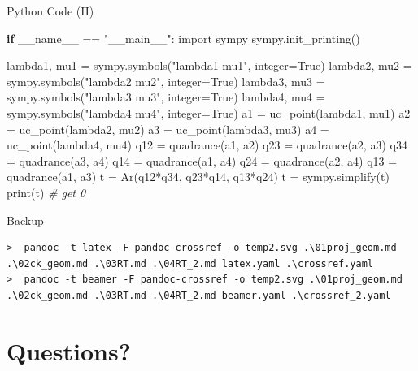 \documentclass[10pt,ignorenonframetext,serif,onlymath]{beamer}
\newenvironment{Shaded}{}{}
\newcommand{\BuiltInTok}[1]{#1}
\newcommand{\CommentTok}[1]{\textcolor[rgb]{0.38,0.63,0.69}{\textit{#1}}}
\newcommand{\ControlFlowTok}[1]{\textcolor[rgb]{0.00,0.44,0.13}{\textbf{#1}}}
\newcommand{\ImportTok}[1]{#1}
\newcommand{\NormalTok}[1]{#1}
\newcommand{\OperatorTok}[1]{\textcolor[rgb]{0.40,0.40,0.40}{#1}}
\newcommand{\StringTok}[1]{\textcolor[rgb]{0.25,0.44,0.63}{#1}}
\newcommand{\VariableTok}[1]{\textcolor[rgb]{0.10,0.09,0.49}{#1}}
\begin{document}
\begin{frame}[fragile]{Python Code (II)}
\protect\hypertarget{sec:python-code-ii}{}

\scriptsize

\begin{Shaded}
\begin{Highlighting}[]
\ControlFlowTok{if} \VariableTok{__name__} \OperatorTok{==} \StringTok{"__main__"}\NormalTok{:}
    \ImportTok{import}\NormalTok{ sympy}
\NormalTok{    sympy.init_printing()}

\NormalTok{    lambda1, mu1 }\OperatorTok{=}\NormalTok{ sympy.symbols(}\StringTok{"lambda1 mu1"}\NormalTok{, integer}\OperatorTok{=}\VariableTok{True}\NormalTok{)}
\NormalTok{    lambda2, mu2 }\OperatorTok{=}\NormalTok{ sympy.symbols(}\StringTok{"lambda2 mu2"}\NormalTok{, integer}\OperatorTok{=}\VariableTok{True}\NormalTok{)}
\NormalTok{    lambda3, mu3 }\OperatorTok{=}\NormalTok{ sympy.symbols(}\StringTok{"lambda3 mu3"}\NormalTok{, integer}\OperatorTok{=}\VariableTok{True}\NormalTok{)}
\NormalTok{    lambda4, mu4 }\OperatorTok{=}\NormalTok{ sympy.symbols(}\StringTok{"lambda4 mu4"}\NormalTok{, integer}\OperatorTok{=}\VariableTok{True}\NormalTok{)}
\NormalTok{    a1 }\OperatorTok{=}\NormalTok{ uc_point(lambda1, mu1)}
\NormalTok{    a2 }\OperatorTok{=}\NormalTok{ uc_point(lambda2, mu2)}
\NormalTok{    a3 }\OperatorTok{=}\NormalTok{ uc_point(lambda3, mu3)}
\NormalTok{    a4 }\OperatorTok{=}\NormalTok{ uc_point(lambda4, mu4)}
\NormalTok{    q12 }\OperatorTok{=}\NormalTok{ quadrance(a1, a2)}
\NormalTok{    q23 }\OperatorTok{=}\NormalTok{ quadrance(a2, a3)}
\NormalTok{    q34 }\OperatorTok{=}\NormalTok{ quadrance(a3, a4)}
\NormalTok{    q14 }\OperatorTok{=}\NormalTok{ quadrance(a1, a4)}
\NormalTok{    q24 }\OperatorTok{=}\NormalTok{ quadrance(a2, a4)}
\NormalTok{    q13 }\OperatorTok{=}\NormalTok{ quadrance(a1, a3)}
\NormalTok{    t }\OperatorTok{=}\NormalTok{ Ar(q12}\OperatorTok{*}\NormalTok{q34, q23}\OperatorTok{*}\NormalTok{q14, q13}\OperatorTok{*}\NormalTok{q24)}
\NormalTok{    t }\OperatorTok{=}\NormalTok{ sympy.simplify(t)}
    \BuiltInTok{print}\NormalTok{(t) }\CommentTok{# get 0}
\end{Highlighting}
\end{Shaded}

\end{frame}

\begin{frame}[fragile]{Backup}
\protect\hypertarget{sec:backup}{}

\begin{verbatim}
>  pandoc -t latex -F pandoc-crossref -o temp2.svg .\01proj_geom.md .\02ck_geom.md .\03RT.md .\04RT_2.md latex.yaml .\crossref.yaml
>  pandoc -t beamer -F pandoc-crossref -o temp2.svg .\01proj_geom.md .\02ck_geom.md .\03RT.md .\04RT_2.md beamer.yaml .\crossref_2.yaml
\end{verbatim}

\end{frame}

\hypertarget{sec:questions}{%
\section{Questions?}\label{sec:questions}}
\end{document}
